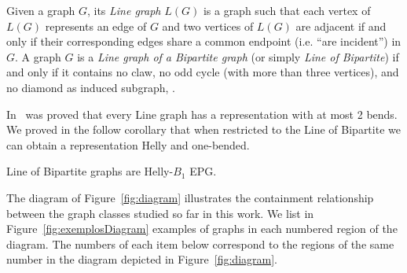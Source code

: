 
Given a graph $G$, its \textit{Line graph} $L(G)$ is a graph such that each vertex of $L(G)$ represents an edge of $G$ and
  two vertices of $L(G)$ are adjacent if and only if their corresponding edges share a common endpoint (i.e. ``are incident'') in $G$.  
A graph $G$ is a \textit{Line graph of a Bipartite graph} (or simply \textit{Line of Bipartite}) if and only if it
contains no claw, no odd cycle  (with more than three vertices), and no diamond as induced subgraph, \cite{harary1974line}.

In~\cite{daniel2014b} was proved that every Line graph has a representation with at most 2 bends. We proved in the follow corollary that when restricted to the Line of Bipartite we can obtain a representation Helly and one-bended.

\begin{corollary}\label{coro:lineOfBipartite}
 Line of Bipartite graphs are Helly-$B_1$ EPG. 
\end{corollary}


The diagram of Figure~\ref{fig:diagram}
illustrates the containment relationship between the graph classes  studied so far in this work. 
We list in Figure~\ref{fig:exemplosDiagram} examples of graphs in each numbered region of the diagram. The numbers of each item below correspond to the regions of the same number in the diagram depicted in Figure~\ref{fig:diagram}.


    
